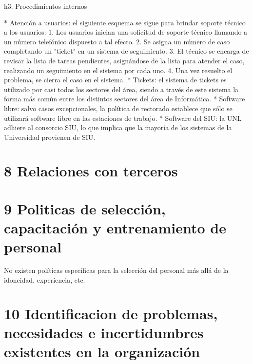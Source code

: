 \documentclass[a4paper,11pt,oneside]{article}
\begin{document}
h3. Procedimientos internos

* Atención a usuarios: el siguiente esquema se sigue para brindar soporte técnico a los usuarios:
  1. Los usuarios inician una solicitud de soporte técnico llamando a un número telefónico dispuesto a tal efecto.
  2. Se asigna un número de caso completando un "ticket" en un sistema de seguimiento.
  3. El técnico se encarga de revisar la lista de tareas pendientes, asignándose de la lista para atender el caso, realizando un seguimiento en el sistema por cada uno.
  4. Una vez resuelto el problema, se cierra el caso en el sistema.
* Tickets: el sistema de tickets es utilizado por casi todos los sectores del área, siendo a través de este sistema la forma más común entre los distintos sectores del área de Informática.
* Software libre: salvo casos excepcionales, la política de rectorado establece que sólo se utilizará software libre en las estaciones de trabajo.
* Software del SIU: la UNL adhiere al consorcio SIU, lo que implica que la mayoría de los sistemas de la Universidad provienen de SIU.

\section*{8 Relaciones con terceros}

\section*{9 Politicas de selección, capacitación y entrenamiento de personal}

No existen políticas específicas para la selección del personal más allá de la idoneidad, experiencia, etc.

\section*{10 Identificacion de problemas, necesidades e incertidumbres existentes en la organización}
\end{document}
